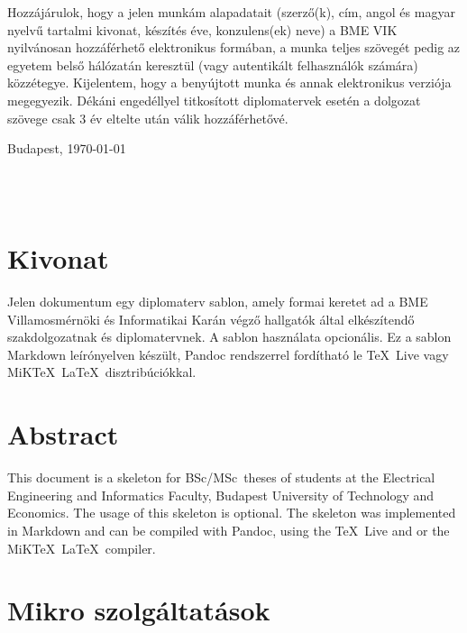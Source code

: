 \documentclass[11pt,magyar,a4paper,oneside,]{report}
\begin{document}
Hozzájárulok, hogy a jelen munkám alapadatait (szerző(k), cím, angol és magyar nyelvű tartalmi kivonat, készítés éve, konzulens(ek) neve) a BME VIK nyilvánosan hozzáférhető elektronikus formában, a munka teljes szövegét pedig az egyetem belső hálózatán keresztül (vagy autentikált felhasználók számára) közzétegye. Kijelentem, hogy a benyújtott munka és annak elektronikus verziója megegyezik. Dékáni engedéllyel titkosított diplomatervek esetén a dolgozat szövege csak 3 év eltelte után válik hozzáférhetővé.

\begin{flushleft}
\vspace*{1cm}
Budapest, \today
\end{flushleft}

\begin{flushright}
 \vspace*{1cm}
 \makebox[7cm]{\rule{6cm}{.4pt}}\\
 \\
\end{flushright}
\thispagestyle{empty}

\vfill
\clearpage
\thispagestyle{empty} %

\chapter*{Kivonat}\label{kivonat}

Jelen dokumentum egy diplomaterv sablon, amely formai keretet ad a BME
Villamosmérnöki és Informatikai Karán végző hallgatók által elkészítendő
szakdolgozatnak és diplomatervnek. A sablon használata opcionális. Ez a
sablon Markdown leírónyelven készült, Pandoc rendszerrel fordítható le
\TeX~Live vagy MiK\TeX~\LaTeX~disztribúciókkal.

\chapter*{Abstract}\label{abstract}

This document is a skeleton for BSc/MSc~theses of students at the
Electrical Engineering and Informatics Faculty, Budapest University of
Technology and Economics. The usage of this skeleton is optional. The
skeleton was implemented in Markdown and can be compiled with Pandoc,
using the \TeX~Live and or the MiK\TeX~\LaTeX~compiler.

\chapter{Mikro szolgáltatások}\label{mikro-szolguxe1ltatuxe1sok}
\end{document}
